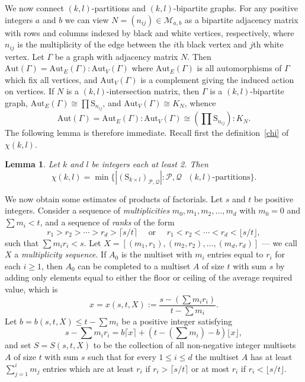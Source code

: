 \documentclass{daj}
\renewcommand\S{\mathrm{S}}
\newcommand\Aut{\mathrm{Aut}}
\renewcommand\P{\mathcal{P}}
\newcommand\M{\mathcal{M}}
\newcommand\Q{\mathcal{Q}}
\theoremstyle{plain}
\newtheorem{lemma}[theorem]{Lemma}
\theoremstyle{definition}
\begin{document}
We now connect $(k,l)$-partitions and $(k,l)$-bipartite graphs. For any positive integers $a$ and $b$ we can view $N=(n_{ij})\in\M_{a,b}$ as a bipartite adjacency matrix with rows and columns indexed by black and white vertices, respectively, where $n_{ij}$ is the multiplicity of the edge between the $i$th black vertex and $j$th white vertex. Let $\Gamma$ be a graph with adjacency matrix $N$. Then $\Aut(\Gamma)=\Aut_{E}(\Gamma) :  \Aut_V(\Gamma)$ where $\Aut_{E}(\Gamma)$ is all automorphisms of $\Gamma$ which fix all vertices, and $\Aut_V(\Gamma)$ is a complement giving the induced action on vertices. If $N$ is a $(k,l)$-intersection matrix, then $\Gamma$ is a $(k,l)$-bipartite graph, $\Aut_{E}(\Gamma)\cong \prod \S_{n_{ij}}$, and $\Aut_{V}(\Gamma)\cong K_N$, whence \begin{equation}\label{autg}\tag{$**$}\Aut(\Gamma)=\Aut_E(\Gamma) :  \Aut_V(\Gamma)\cong \left(\prod\S_{n_{ij}}\right) :  K_N.\end{equation} The following lemma is therefore immediate. Recall first the definition~\eqref{chi} of $\chi(k,l)$.
\begin{lemma}\label{minpq}
Let $k$ and $l$ be integers each at least 2. Then $$\chi(k,l)=\min\{|(\S_{k\times l})_{\P,\Q}| : \P,\Q \text{ $(k,l)$-partitions}\}.$$
\end{lemma}
We now obtain some estimates of products of factorials. 
Let $s$ and $t$ be positive integers. Consider a sequence of \emph{multiplicities} $m_0,m_1,m_2,\dots,m_d$ with $m_0=0$ and $\sum m_i<t$, and a sequence of \emph{ranks} of the form $$r_1>r_2>\cdots> r_d>\lceil s/t\rceil\quad\text{ or }\quad r_1<r_2<\cdots< r_d<\lfloor s/t \rfloor,$$ such that $\sum m_ir_i<s$.  Let $X=[(m_1,r_1),(m_2,r_2),\dots, (m_d,r_d)]$ 
 --- we call $X$ a \emph{multiplicity sequence}. If $A_0$ is the multiset with $m_i$ entries equal to $r_i$ for each $i\geq 1$, then $A_0$ can be completed to a multiset $A$ of size $t$ with sum $s$ by adding only elements equal to either the floor or ceiling of the average required value, which is $$x=x(s,t,X):=\frac{s-\left(\sum m_ir_i\right)}{t-\sum m_i}.$$ 
 Let $b=b(s,t,X)\leq t-\sum m_{i}$ be a positive integer satisfying $$s-\sum m_ir_i=b\lceil x\rceil +\left(t-\left(\sum m_i\right)-b\right)\lfloor x\rfloor,$$ and set $S=S(s,t,X)$ to be the collection of all non-negative integer multisets $A$ of size $t$ with sum $s$ such that for every $1\leq i\leq d$ the multiset $A$ has at least $\sum_{j=1}^i m_j$ entries which are at least $r_i$ if $r_i> \lceil s/t\rceil$ or at most $r_i$ if $r_i<\lfloor s/t\rfloor$.
\end{document}
